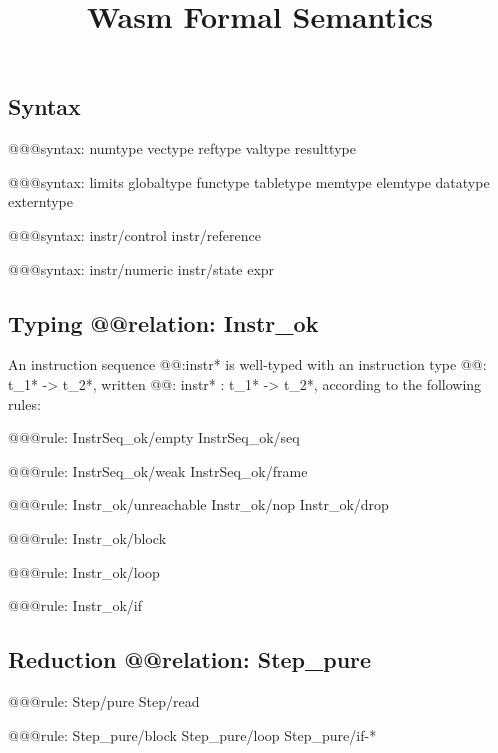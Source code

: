 \documentclass[a4paper]{scrartcl}
\title{Wasm Formal Semantics}
\begin{document}
\small

\maketitle


\subsection*{Syntax}

@@@{syntax: numtype vectype reftype valtype resulttype}

@@@{syntax:
  limits
  globaltype
  functype
  tabletype
  memtype
  elemtype
  datatype
  externtype
}

@@@{syntax: instr/control instr/reference}

@@@{syntax: instr/numeric instr/state expr}


\subsection*{Typing @@{relation: Instr_ok}}

An instruction sequence @@{:instr*} is well-typed with an instruction type @@{: t_1* -> t_2*}, written @@{: instr* : t_1* -> t_2*}, according to the following rules:

@@@{rule: InstrSeq_ok/empty InstrSeq_ok/seq}

@@@{rule: InstrSeq_ok/weak InstrSeq_ok/frame}


@@@{rule: Instr_ok/unreachable Instr_ok/nop Instr_ok/drop}

@@@{rule: Instr_ok/block}

@@@{rule: Instr_ok/loop}

@@@{rule: Instr_ok/if}


\subsection*{Reduction @@{relation: Step_pure}}

@@@{rule: Step/pure Step/read}

@@@{rule: Step_pure/block Step_pure/loop Step_pure/if-*}
\end{document}
